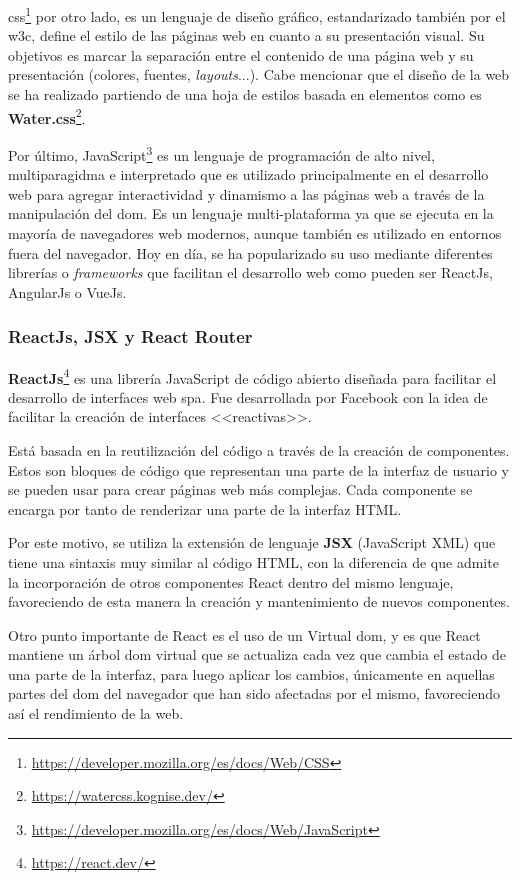 \acrfull{css}\footnote{\url{https://developer.mozilla.org/es/docs/Web/CSS}} por otro lado, es un lenguaje de diseño gráfico, estandarizado también por el \acrshort{w3c}, define el estilo de las páginas web en cuanto a su presentación visual. Su objetivos es marcar la separación entre el contenido de una página web y su presentación (colores, fuentes, \textit{layouts}...).
Cabe mencionar que el diseño de la web se ha realizado partiendo de una hoja de estilos basada en elementos como es \textbf{Water.css}\footnote{\url{https://watercss.kognise.dev/}}.

Por último, JavaScript\footnote{\url{https://developer.mozilla.org/es/docs/Web/JavaScript}} es un lenguaje de programación de alto nivel, multiparagidma e interpretado que es utilizado principalmente en el desarrollo web para agregar interactividad y dinamismo a las páginas web a través de la manipulación del \acrfull{dom}. Es un lenguaje multi-plataforma ya que se ejecuta en la mayoría de navegadores web modernos, aunque también es utilizado en entornos fuera del navegador. Hoy en día, se ha popularizado su uso mediante diferentes librerías o \textit{frameworks} que facilitan el desarrollo web como pueden ser ReactJs, AngularJs o VueJs.

\subsubsection{ReactJs, JSX y React Router}

\textbf{ReactJs}\footnote{\url{https://react.dev/}} es una librería JavaScript de código abierto diseñada para facilitar el desarrollo de interfaces web \acrfull{spa}. Fue desarrollada por Facebook con la idea de facilitar la creación de interfaces <<reactivas>>.

Está basada en la reutilización del código a través de la creación de componentes. Estos son bloques de código que representan una parte de la interfaz de usuario y se pueden usar para crear páginas web más complejas. Cada componente se encarga por tanto de renderizar una parte de la interfaz HTML.

Por este motivo, se utiliza la extensión de lenguaje \textbf{JSX} (JavaScript XML) que tiene una sintaxis muy similar al código HTML, con la diferencia de que admite la incorporación de otros componentes React dentro del mismo lenguaje, favoreciendo de esta manera la creación y mantenimiento de nuevos componentes.

Otro punto importante de React es el uso de un Virtual \acrshort{dom}, y es que React mantiene un árbol \acrshort{dom} virtual que se actualiza cada vez que cambia el estado de una parte de la interfaz, para luego aplicar los cambios, únicamente en aquellas partes del \acrshort{dom} del navegador que han sido afectadas por el mismo, favoreciendo así el rendimiento de la web.

